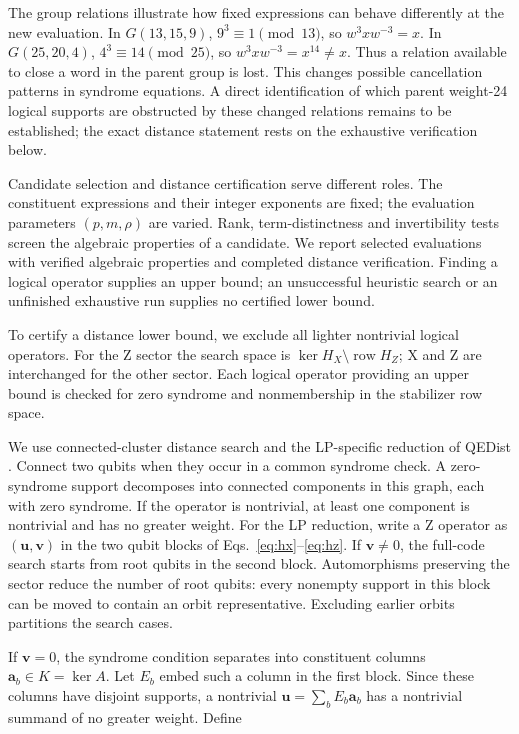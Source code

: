 \documentclass[12pt]{article}
\begin{document}
The group relations illustrate how fixed expressions can behave differently
at the new evaluation. In $G(13,15,9)$, $9^3\equiv1\pmod{13}$, so
$w^3xw^{-3}=x$. In $G(25,20,4)$, $4^3\equiv14\pmod{25}$, so
$w^3xw^{-3}=x^{14}\ne x$. Thus a relation available to close a word in
the parent group is lost. This changes possible cancellation patterns in
syndrome equations. A direct identification of which parent weight-24
logical supports are obstructed by these changed relations remains to
be established; the exact distance statement rests on the exhaustive
verification below.

Candidate selection and distance certification serve different roles.
The constituent expressions and their integer exponents are fixed; the
evaluation parameters $(p,m,\rho)$ are varied. Rank, term-distinctness
and invertibility tests screen the algebraic properties of a candidate.
We report selected evaluations with verified algebraic properties and
completed distance verification. Finding a logical
operator supplies an upper bound; an unsuccessful heuristic search or
an unfinished exhaustive run supplies no certified lower bound.

To certify a distance lower bound, we exclude all lighter nontrivial logical operators.
For the Z sector the search space is $\ker H_X\setminus\operatorname{row}H_Z$;
X and Z are interchanged for the other sector.
Each logical operator providing an upper bound is checked for zero syndrome
and nonmembership in the stabilizer row space.

We use connected-cluster distance search \cite{clusters} and the LP-specific
reduction of QEDist \cite[Sec.~3.6]{qedist}.
Connect two qubits when they occur in a common
syndrome check. A zero-syndrome support decomposes into connected components
in this graph, each with zero syndrome. If the operator is nontrivial, at least
one component is nontrivial and has no greater weight.
For the LP reduction, write a Z operator as $(\mathbf u,\mathbf v)$
in the two qubit blocks of Eqs.~\eqref{eq:hx}--\eqref{eq:hz}.
If $\mathbf v\ne0$, the full-code search starts from root qubits in the second block.
Automorphisms preserving the sector reduce the number of root qubits:
every nonempty support
in this block can be moved to contain an orbit representative. Excluding
earlier orbits partitions the search cases.

If $\mathbf v=0$, the syndrome condition separates into constituent columns
$\mathbf a_b\in K=\ker A$. Let $E_b$ embed such a column in the first block.
Since these columns have disjoint supports, a nontrivial
$\mathbf u=\sum_bE_b\mathbf a_b$ has a nontrivial summand of no greater weight.
Define
\end{document}
